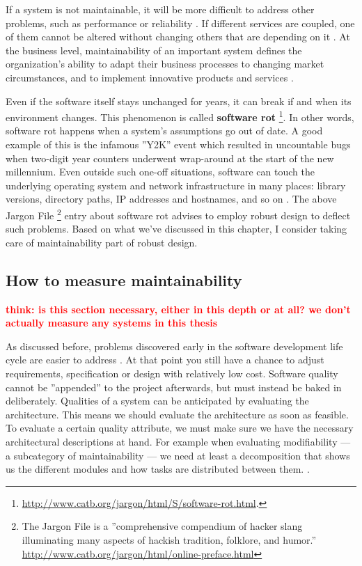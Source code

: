 \documentclass[utf8,english]{gradu3}
\newcommand{\todo}[1]{\textbf{\textcolor{red}{#1}}}
\begin{document}
If a system is not maintainable, it will be more difficult to address other
problems, such as performance or reliability \parencite[46]{Bouwers2010}. If
different services are coupled, one of them cannot be altered without changing
others that are depending on it \parencite[2]{Vale2022}. At the business level,
maintainability of an important system defines the organization's ability to
adapt their business processes to changing market circumstances, and to
implement innovative products and services \parencite[21]{Broy2006}.

Even if the software itself stays unchanged for years, it can break if and when
its environment changes. This phenomenon is called \textbf{software rot}
\footnote{\url{http://www.catb.org/jargon/html/S/software-rot.html}.}. In other
words, software rot happens when a system's assumptions go out of date. A good
example of this is the infamous ''Y2K'' event which resulted in uncountable bugs
when two-digit year counters underwent wrap-around at the start of the new
millennium. Even outside such one-off situations, software can touch the
underlying operating system and network infrastructure in many places: library
versions, directory paths, IP addresses and hostnames, and so on
\parencite{Heroku2011}. The above Jargon File \footnote{The Jargon File is a
  ''comprehensive compendium of hacker slang illuminating many aspects of hackish
  tradition, folklore, and humor.''
  \url{http://www.catb.org/jargon/html/online-preface.html}} entry about software
rot advises to employ robust design to deflect such problems. Based on what
we've discussed in this chapter, I consider taking care of maintainability part
of robust design.


\subsection{How to measure maintainability}

\todo{think: is this section necessary, either in this depth or at all?
  we don't actually measure any systems in this thesis}

As discussed before, problems discovered early in the software development life
cycle are easier to address \parencite{Bass1998}. At that point you still have a
chance to adjust requirements, specification or design with relatively low cost.
Software quality cannot be ''appended'' to the project afterwards, but must
instead be baked in deliberately. Qualities of a system can be anticipated by
evaluating the architecture. This means we should evaluate the architecture as
soon as feasible. To evaluate a certain quality attribute, we must make sure we
have the necessary architectural descriptions at hand. For example when
evaluating modifiability --- a subcategory of maintainability --- we need at
least a decomposition that shows us the different modules and how tasks are
distributed between them. \parencite[32, 190-191]{Bass1998}.
\end{document}
